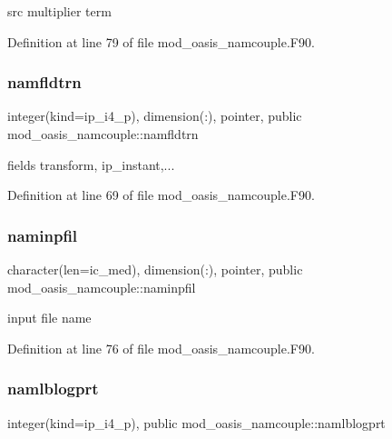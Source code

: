 src multiplier term 



Definition at line 79 of file mod\+\_\+oasis\+\_\+namcouple.\+F90.

\mbox{\label{namespacemod__oasis__namcouple_a5f81bc00e6dc045770edd4093f68278c}} 
\subsubsection{\texorpdfstring{namfldtrn}{namfldtrn}}
{\footnotesize\ttfamily integer(kind=ip\+\_\+i4\+\_\+p), dimension(\+:), pointer, public mod\+\_\+oasis\+\_\+namcouple\+::namfldtrn}



fields transform, ip\+\_\+instant,... 



Definition at line 69 of file mod\+\_\+oasis\+\_\+namcouple.\+F90.

\mbox{\label{namespacemod__oasis__namcouple_a15fc11ff1c1d5718ff127a06a205a82c}} 
\subsubsection{\texorpdfstring{naminpfil}{naminpfil}}
{\footnotesize\ttfamily character(len=ic\+\_\+med), dimension(\+:), pointer, public mod\+\_\+oasis\+\_\+namcouple\+::naminpfil}



input file name 



Definition at line 76 of file mod\+\_\+oasis\+\_\+namcouple.\+F90.

\mbox{\label{namespacemod__oasis__namcouple_ac2f9ee614d937824f48d80313f878d31}} 
\subsubsection{\texorpdfstring{namlblogprt}{namlblogprt}}
{\footnotesize\ttfamily integer(kind=ip\+\_\+i4\+\_\+p), public mod\+\_\+oasis\+\_\+namcouple\+::namlblogprt}




